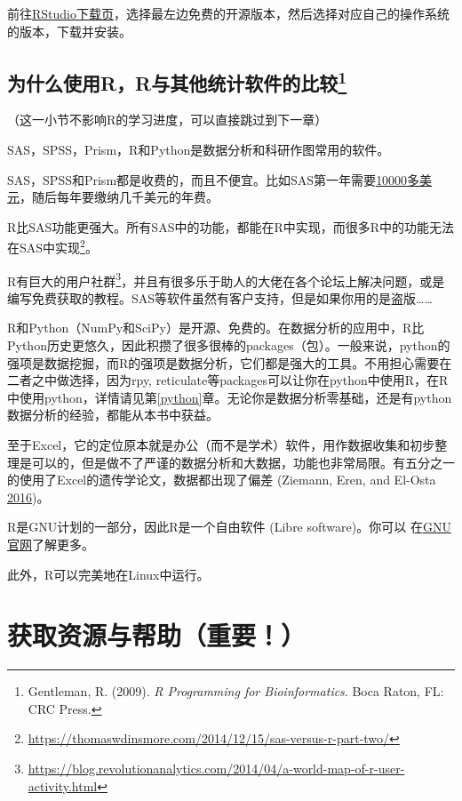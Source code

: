 \documentclass[]{book}
\let\rmarkdownfootnote\footnote%
\def\footnote{\protect\rmarkdownfootnote}
\begin{document}
前往\href{https://www.rstudio.com/products/rstudio/download/}{RStudio下载页}，选择最左边免费的开源版本，然后选择对应自己的操作系统的版本，下载并安装。

\hypertarget{youshi}{%
\section[为什么使用R，R与其他统计软件的比较]{\texorpdfstring{为什么使用R，R与其他统计软件的比较\footnote{Gentleman, R. (2009). \emph{R Programming for Bioinformatics}. Boca Raton, FL: CRC Press.}}{为什么使用R，R与其他统计软件的比较}}\label{youshi}}

（这一小节不影响R的学习进度，可以直接跳过到下一章）

SAS，SPSS，Prism，R和Python是数据分析和科研作图常用的软件。

SAS，SPSS和Prism都是收费的，而且不便宜。比如SAS第一年需要\href{http://www.sas.com/store/products-solutions/cSoftware-p1.html}{10000多美元}，随后每年要缴纳几千美元的年费。

R比SAS功能更强大。所有SAS中的功能，都能在R中实现，而很多R中的功能无法在SAS中实现\footnote{\url{https://thomaswdinsmore.com/2014/12/15/sas-versus-r-part-two/}}。

R有巨大的用户社群\footnote{\url{https://blog.revolutionanalytics.com/2014/04/a-world-map-of-r-user-activity.html}}，并且有很多乐于助人的大佬在各个论坛上解决问题，或是编写免费获取的教程。SAS等软件虽然有客户支持，但是如果你用的是盗版\ldots{}\ldots{}

R和Python（NumPy和SciPy）是开源、免费的。在数据分析的应用中，R比Python历史更悠久，因此积攒了很多很棒的packages（包）。一般来说，python的强项是数据挖掘，而R的强项是数据分析，它们都是强大的工具。不用担心需要在二者之中做选择，因为rpy, reticulate等packages可以让你在python中使用R，在R中使用python，详情请见第\ref{python}章。无论你是数据分析零基础，还是有python数据分析的经验，都能从本书中获益。

至于Excel，它的定位原本就是办公（而不是学术）软件，用作数据收集和初步整理是可以的，但是做不了严谨的数据分析和大数据，功能也非常局限。有五分之一的使用了Excel的遗传学论文，数据都出现了偏差 (Ziemann, Eren, and El-Osta \protect\hyperlink{ref-Ziemann2016Gene-name-errors}{2016})。

R是GNU计划的一部分，因此R是一个自由软件 (Libre software)。你可以 在\href{https://www.gnu.org/philosophy/free-sw.zh-cn.html}{GNU官网}了解更多。

此外，R可以完美地在Linux中运行。

\hypertarget{getting-help}{%
\chapter{获取资源与帮助（重要！）}\label{getting-help}}
\end{document}
